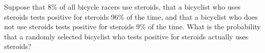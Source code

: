 \documentclass[../main.tex]{subfiles}
\begin{document}
Suppose that 8\% of all bicycle racers use steroids, that a bicyclist who uses steroids tests positive for steroids 96\% of the time, and that a bicyclist who does not use steroids tests positive for steroids 9\% of the time.
What is the probability that a randomly selected bicyclist who tests positive for steroids actually uses steroids?

\solution
\end{document}
